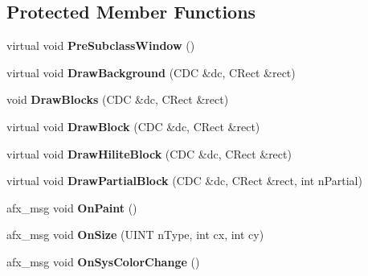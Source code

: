 \subsection*{Protected Member Functions}
\begin{DoxyCompactItemize}
\item 
\hypertarget{class_cx_prog_ctrl_a5ea634887cf38d5f427e42c090b6a9a9}{virtual void {\bfseries Pre\-Subclass\-Window} ()}\label{class_cx_prog_ctrl_a5ea634887cf38d5f427e42c090b6a9a9}

\item 
\hypertarget{class_cx_prog_ctrl_a51323d34e2511489ff493db671cbd999}{virtual void {\bfseries Draw\-Background} (C\-D\-C \&dc, C\-Rect \&rect)}\label{class_cx_prog_ctrl_a51323d34e2511489ff493db671cbd999}

\item 
\hypertarget{class_cx_prog_ctrl_a6d678fffc945ba1bb0438a2631b710a0}{void {\bfseries Draw\-Blocks} (C\-D\-C \&dc, C\-Rect \&rect)}\label{class_cx_prog_ctrl_a6d678fffc945ba1bb0438a2631b710a0}

\item 
\hypertarget{class_cx_prog_ctrl_a8e25f2a6244aec0048ce3f11ce5e5876}{virtual void {\bfseries Draw\-Block} (C\-D\-C \&dc, C\-Rect \&rect)}\label{class_cx_prog_ctrl_a8e25f2a6244aec0048ce3f11ce5e5876}

\item 
\hypertarget{class_cx_prog_ctrl_aea8c4905ed82de763e127e71e033e820}{virtual void {\bfseries Draw\-Hilite\-Block} (C\-D\-C \&dc, C\-Rect \&rect)}\label{class_cx_prog_ctrl_aea8c4905ed82de763e127e71e033e820}

\item 
\hypertarget{class_cx_prog_ctrl_aab6e5c46a61ef6dcb3802e33d7847362}{virtual void {\bfseries Draw\-Partial\-Block} (C\-D\-C \&dc, C\-Rect \&rect, int n\-Partial)}\label{class_cx_prog_ctrl_aab6e5c46a61ef6dcb3802e33d7847362}

\item 
\hypertarget{class_cx_prog_ctrl_a5639c055e7d0c8e71fb6e154d78e1fa5}{afx\-\_\-msg void {\bfseries On\-Paint} ()}\label{class_cx_prog_ctrl_a5639c055e7d0c8e71fb6e154d78e1fa5}

\item 
\hypertarget{class_cx_prog_ctrl_af80675969547341fa43d68e19808149c}{afx\-\_\-msg void {\bfseries On\-Size} (U\-I\-N\-T n\-Type, int cx, int cy)}\label{class_cx_prog_ctrl_af80675969547341fa43d68e19808149c}

\item 
\hypertarget{class_cx_prog_ctrl_a1cd8f5feaff89f377823169415807767}{afx\-\_\-msg void {\bfseries On\-Sys\-Color\-Change} ()}\label{class_cx_prog_ctrl_a1cd8f5feaff89f377823169415807767}


\end{DoxyCompactItemize}
